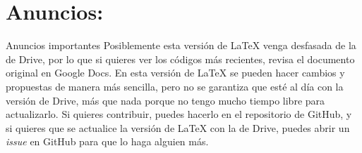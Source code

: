 \section{Anuncios:}
\begin{myquote}{Anuncios importantes}
    Posiblemente esta versión de LaTeX venga desfasada de la de Drive, por lo que si quieres ver los códigos más recientes, revisa el documento original en Google Docs. En esta versión de LaTeX se pueden hacer cambios y propuestas de manera más sencilla, pero no se garantiza que esté al día con la versión de Drive, más que nada porque no tengo mucho tiempo libre para actualizarlo. Si quieres contribuir, puedes hacerlo en el repositorio de GitHub, y si quieres que se actualice la versión de LaTeX con la de Drive, puedes abrir un \emph{issue} en GitHub para que lo haga alguien más.
\end{myquote}